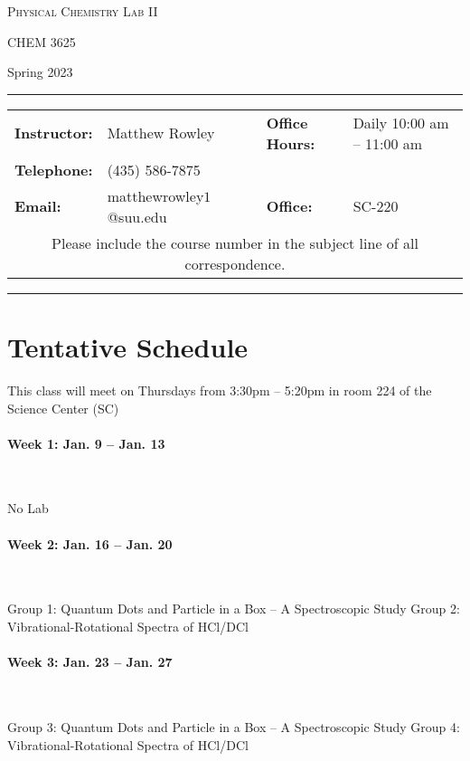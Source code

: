 \documentclass[12pt, letterpaper]{article}
\begin{document}
\begin{center}
	{\Large \textsc{Physical Chemistry Lab II}}

	CHEM 3625
\end{center}

\begin{center}
	{\large Spring 2023}
\end{center}
\begin{center}
	\rule{0.99\textwidth}{0.4pt}
	\begin{tabular}{llcll}
		\textbf{Instructor:} & Matthew Rowley           &  & \textbf{Office Hours:} & Daily 10:00 am -- 11:00 am \\
		\textbf{Telephone:}  & (435) 586-7875           &  &                        &                            \\
		\textbf{Email:}      & matthewrowley$1$@suu.edu &  & \textbf{Office:}       & SC-220                     \\
		\multicolumn{5}{c}{Please include the course number in the subject line of all correspondence.}
	\end{tabular}
	\rule{0.99\textwidth}{0.4pt}
\end{center}

\section*{Tentative Schedule}
This class will meet on Thursdays from 3:30pm -- 5:20pm in room 224 of the Science Center (SC)

\paragraph{Week 1: Jan. 9 -- Jan. 13}~

No Lab

\paragraph{Week 2: Jan. 16 -- Jan. 20}~

Group 1: Quantum Dots and Particle in a Box – A Spectroscopic Study
Group 2: Vibrational-Rotational Spectra of HCl/DCl
\paragraph{Week 3: Jan. 23 -- Jan. 27}~

Group 3: Quantum Dots and Particle in a Box – A Spectroscopic Study
Group 4: Vibrational-Rotational Spectra of HCl/DCl
\end{document}
